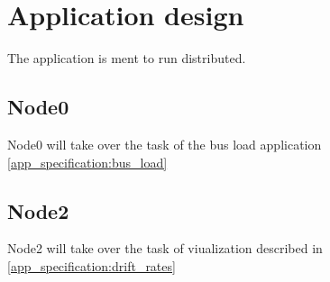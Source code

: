 \section{Application design}

The application is ment to run distributed.

\subsection{Node0}
Node0 will take over the task of the bus load application
\ref{app_specification:bus_load} 

\subsection{Node2}
Node2 will take over the task of viualization described in
\ref{app_specification:drift_rates} 
